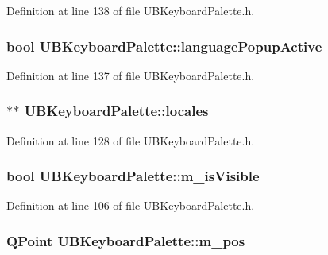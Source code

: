 Definition at line 138 of file U\-B\-Keyboard\-Palette.\-h.

\hypertarget{class_u_b_keyboard_palette_a81336a2103daeb7dc6cdfccbd16d3c28}{
\subsubsection[{language\-Popup\-Active}]{\setlength{\rightskip}{0pt plus 5cm}bool U\-B\-Keyboard\-Palette\-::language\-Popup\-Active\hspace{0.3cm}{\ttfamily [protected]}}}\label{d6/d6e/class_u_b_keyboard_palette_a81336a2103daeb7dc6cdfccbd16d3c28}


Definition at line 137 of file U\-B\-Keyboard\-Palette.\-h.

\hypertarget{class_u_b_keyboard_palette_a21f5effb3b82fc431de3e5f7f35d612d}{
\subsubsection[{locales}]{$\ast$$\ast$ U\-B\-Keyboard\-Palette\-::locales\hspace{0.3cm}{\ttfamily [protected]}}}\label{d6/d6e/class_u_b_keyboard_palette_a21f5effb3b82fc431de3e5f7f35d612d}


Definition at line 128 of file U\-B\-Keyboard\-Palette.\-h.

\hypertarget{class_u_b_keyboard_palette_af8d731f629b8476184064ca887a6f5fb}{
\subsubsection[{m\-\_\-is\-Visible}]{\setlength{\rightskip}{0pt plus 5cm}bool U\-B\-Keyboard\-Palette\-::m\-\_\-is\-Visible}}\label{d6/d6e/class_u_b_keyboard_palette_af8d731f629b8476184064ca887a6f5fb}


Definition at line 106 of file U\-B\-Keyboard\-Palette.\-h.

\hypertarget{class_u_b_keyboard_palette_acaac045d872cd85602623a0c7c65d4c7}{
\subsubsection[{m\-\_\-pos}]{\setlength{\rightskip}{0pt plus 5cm}Q\-Point U\-B\-Keyboard\-Palette\-::m\-\_\-pos}}\label{d6/d6e/class_u_b_keyboard_palette_acaac045d872cd85602623a0c7c65d4c7}


